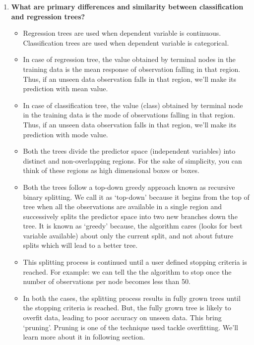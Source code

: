 \begin{enumerate}



\item{\textbf{\color{blue} What are primary differences and similarity between classification and regression trees?}}

\begin{itemize}
\item Regression trees are used when dependent variable is continuous. Classification trees are used when dependent variable is categorical.
\item In case of regression tree, the value obtained by terminal nodes in the training data is the mean response of observation falling in that region. Thus, if an unseen data observation falls in that region, we’ll make its prediction with mean value.
\item In case of classification tree, the value (class) obtained by terminal node in the training data is the mode of observations falling in that region. Thus, if an unseen data observation falls in that region, we’ll make its prediction with mode value.
\item Both the trees divide the predictor space (independent variables) into distinct and non-overlapping regions. For the sake of simplicity, you can think of these regions as high dimensional boxes or boxes.
\item Both the trees follow a top-down greedy approach known as recursive binary splitting. We call it as ‘top-down’ because it begins from the top of tree when all the observations are available in a single region and successively splits the predictor space into two new branches down the tree. It is known as ‘greedy’ because, the algorithm cares (looks for best variable available) about only the current split, and not about future splits which will lead to a better tree.
\item This splitting process is continued until a user defined stopping criteria is reached. For example: we can tell the the algorithm to stop once the number of observations per node becomes less than 50.
\item In both the cases, the splitting process results in fully grown trees until the stopping criteria is reached. But, the fully grown tree is likely to overfit data, leading to poor accuracy on unseen data. This bring ‘pruning’. Pruning is one of the technique used tackle overfitting. We’ll learn more about it in following section.
\end{itemize}









\end{enumerate}
